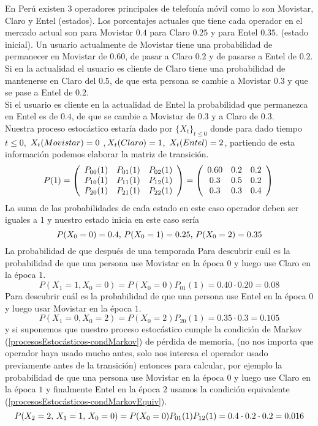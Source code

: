 \begin{Ejm}
    En Perú existen $3$ operadores principales de telefonía móvil como lo son Movistar, Claro y Entel (estados).
    Los porcentajes actuales que tiene cada operador en el mercado actual son para Movistar $0.4$ para Claro $0.25$ y para Entel $0.35$. (estado inicial).
    Un usuario actualmente de Movistar tiene una probabilidad de permanecer en Movistar de $0.60$, de pasar a Claro $0.2$ y de pasarse a Entel de $0.2$.\\Si en la actualidad el usuario es cliente de Claro tiene una probabilidad de mantenerse en Claro del $0.5$, de que esta persona se cambie a Movistar  $0.3$ y que se pase a Entel de $0.2$.\\Si el usuario es cliente en la actualidad de Entel la probabilidad que permanezca en Entel es de $0.4$, de que se cambie a Movistar de $0.3$ y a Claro de $0.3$.\\
    Nuestra proceso estocástico estaría dado por $\{X_t\}_{t\leq 0}$ donde para dado tiempo $t\leq 0$, $\thinspace X_t(Movistar)=0$ ,$\thinspace X_t(Claro)=1$, $\thinspace X_t(Entel)=2$, partiendo de esta información podemos elaborar la matriz de transición.
   $$P(1)=\left( \begin{array}{ccc}
    P_{0 0}(1) & P_{0 1}(1) & P_{0 2}(1) \\
    P_{1 0}(1) & P_{1 1}(1) & P_{1 2}(1) \\
    P_{2 0}(1) & P_{2 1}(1) & P_{2 2}(1)  
    \end{array}\right)=
    \left( \begin{array}{ccc}
    0.60 & 0.2 & 0.2 \\ 
    0.3 & 0.5 & 0.2 \\
    0.3 & 0.3 & 0.4
    \end{array}\right)\\$$
    La suma de las probabilidades de cada estado en este caso operador deben ser iguales a $1$ y nuestro estado inicia en este caso sería $$P(X_0 = 0)= 0.4,\thinspace P(X_0 = 1)= 0.25 ,\thinspace P(X_0 = 2)= 0.35$$
    La probabilidad de que después de una temporada 
    Para descubrir cuál es la probabilidad de que una persona use Movistar en la época $0$ y luego use Claro en la época $1$. 
    $$P(X_1=1 , X_0=0) = P(X_0=0)P_{01}(1)= 0.40\cdot 0.20 =0.08$$
    Para descubrir cuál es la probabilidad de que una persona use Entel en la época $0$ y luego usar Movistar en la época $1$.
    $$P(X_1=0 , X_0=2) = P(X_0=2)P_{20}(1)=0.35\cdot 0.3 =0.105$$
    y si suponemos que nuestro proceso estocástico cumple la condición de Markov (\ref{procesosEstocásticos-condMarkov}) de pérdida de memoria, (no nos importa que operador haya usado mucho antes, solo nos interesa el operador usado previamente antes de la transición) entonces para calcular, por ejemplo la probabilidad de que una persona use Movistar en la época $0$ y luego use Claro en la época $1$ y finalmente Entel en la época $2$ usamos la condición equivalente (\ref{procesosEstocásticos-condMarkovEquiv}).
    $$P(X_2=2,\thinspace X_1=1,\thinspace X_0=0)=P(X_0=0)P_{01}(1)P_{12}(1)=0.4\cdot 0.2\cdot 0.2=0.016$$
    \end{Ejm}
